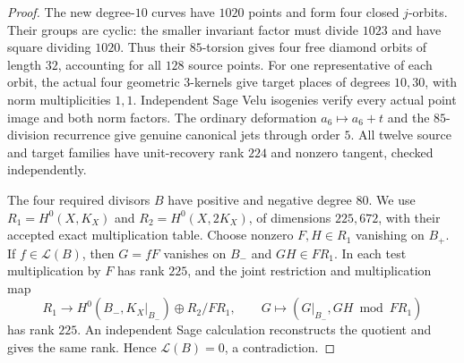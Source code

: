 \begin{proof}
The new degree-$10$ curves have $1020$ points and form four closed
$j$-orbits. Their groups are cyclic: the smaller invariant factor
must divide $1023$ and have square dividing $1020$. Thus their
$85$-torsion gives four free diamond orbits of length $32$, accounting
for all $128$ source points. For one representative of each orbit,
the actual four geometric $3$-kernels give target places of degrees
$10,30$, with norm multiplicities $1,1$. Independent Sage Velu
isogenies verify every actual point image and both norm factors.
The ordinary deformation $a_6\mapsto a_6+t$ and the $85$-division
recurrence give genuine canonical jets through order $5$.
All twelve source and target families have unit-recovery rank $224$
and nonzero tangent, checked independently.

The four required divisors $B$ have positive and negative degree $80$.
We use $R_1=H^0(X,K_X)$ and $R_2=H^0(X,2K_X)$, of dimensions
$225,672$, with their accepted exact multiplication table.
Choose nonzero $F,H\in R_1$ vanishing on $B_+$. If
$f\in\mathcal L(B)$, then $G=fF$ vanishes on $B_-$ and
$GH\in FR_1$. In each test multiplication by $F$ has rank $225$,
and the joint restriction and multiplication map
\[
 R_1\longrightarrow H^0(B_-,K_X|_{B_-})\oplus R_2/FR_1,
 \qquad G\longmapsto(G|_{B_-},GH\bmod FR_1)
\]
has rank $225$. An independent Sage calculation reconstructs the
quotient and gives the same rank. Hence $\mathcal L(B)=0$, a
contradiction.
\end{proof}
